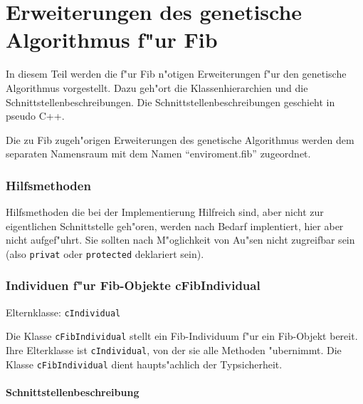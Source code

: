 %
%
%
%

\newpage
\part{Erweiterungen des genetische Algorithmus f"ur Fib}
\label{partImplementationAlgorithmusFib}

In diesem Teil werden die f"ur Fib n"otigen Erweiterungen f"ur den genetische Algorithmus vorgestellt. Dazu geh"ort die Klassenhierarchien und die Schnittstellenbeschreibungen. Die Schnittstellenbeschreibungen geschieht in pseudo C++.

Die zu Fib zugeh"origen Erweiterungen des genetische Algorithmus werden dem separaten Namensraum mit dem Namen ``enviroment.fib'' zugeordnet.


\section{Hilfsmethoden}

Hilfsmethoden die bei der Implementierung Hilfreich sind, aber nicht zur eigentlichen Schnittstelle geh"oren, werden nach Bedarf implentiert, hier aber nicht aufgef"uhrt. Sie sollten nach M"oglichkeit von Au"sen nicht zugreifbar sein (also \verb|privat| oder \verb|protected| deklariert sein).


\section{Individuen f"ur Fib-Objekte cFibIndividual}

Elternklasse: \verb|cIndividual|

\bigskip\noindent
Die Klasse \verb|cFibIndividual| stellt ein Fib-Individuum f"ur ein Fib-Objekt bereit. Ihre Elterklasse ist \verb|cIndividual|, von der sie alle Methoden "ubernimmt. Die Klasse \verb|cFibIndividual| dient haupts"achlich der Typsicherheit.


\subsection{Schnittstellenbeschreibung}

